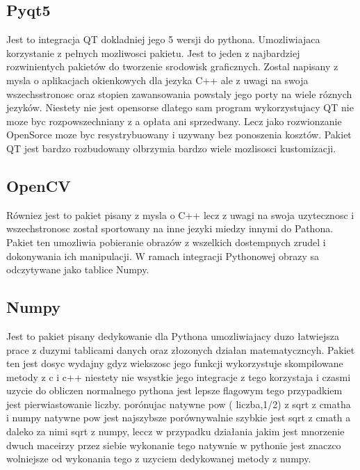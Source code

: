 \documentclass[11pt,a4paper]{article}
\begin{document}
    \subsection{Pyqt5}
    \hspace{1cm} Jest to integracja QT dokladniej jego 5 wersji do pythona. Umozliwiajaca korzystanie z pełnych mozliwosci pakietu.
    \hspace{1cm} Jest to jeden z najbardziej rozwinientych pakietów do tworzenie srodowisk graficznych. Zostal napisany z mysla o aplikacjach okienkowych dla jezyka C++ ale z uwagi na swoja wszechsstronosc oraz stopien zawansowania powstaly jego porty na wiele róznych jezyków. Niestety nie jest opensorse dlatego sam program wykorzystujacy QT nie moze byc rozpowszechniany z a opłata ani sprzedwany. Lecz jako rozwionzanie OpenSorce moze byc resystrybuowany i uzywany bez ponoszenia kosztów. Pakiet QT jest bardzo rozbudowany olbrzymia bardzo wiele mozlisosci kustomizacji.

    \subsection{OpenCV}
    \hspace{1cm} Równiez jest to pakiet pisany z mysla o C++ lecz z uwagi na swoja uzytecznosc i wszechstronosc został sportowany na inne jezyki miedzy innymi do Pathona. Pakiet ten umozliwia pobieranie obrazów z wszelkich dostempnych zrudel i dokonywania ich manipulacji. W ramach integracji Pythonowej obrazy sa odczytywane jako tablice Numpy.

    \subsection{Numpy}
    \hspace{1cm} Jest to pakiet pisany dedykowanie dla Pythona umozliwiajacy duzo łatwiejsza prace z duzymi tablicami danych oraz złozonych działan matematyczncyh. Pakiet ten jest dosyc wydajny gdyz wiekszosc jego funkcji wykorzystuje skompilowane metody z c i c++ niestety nie wsystkie jego integracje z tego korzystaja i czasmi uzycie do obliczen normalnego pythona jest lepsze flagowym tego przypadkiem jest pierwiastowanie liczby. porónujac natywne pow ( liczba,1/2) z sqrt z cmatha i numpy natywne pow jest najszybsze porównywalnie szybkie jest sqrt z cmath a daleko za nimi sqrt z numpy, leccz w przypadku działania jakim jest mnorzenie dwuch maceirzy przez siebie wykonanie tego natywnie w pythonie jest znaczco wolniejsze od wykonania tego z uzyciem dedykowanej metody z numpy.
\end{document}
